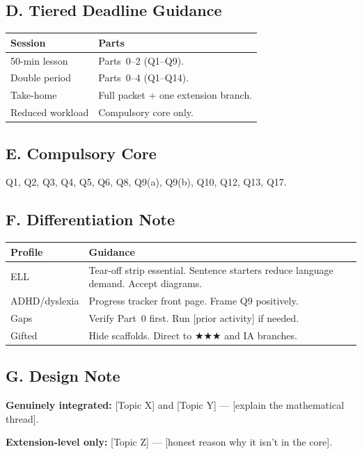 \documentclass[11pt,a4paper]{article}
\begin{document}
\subsection*{D. Tiered Deadline Guidance}
\begin{tabular}{@{}p{3.8cm}p{10.8cm}@{}}
\toprule
\textbf{Session} & \textbf{Parts}\\
\midrule
50-min lesson & Parts~0--2 (Q1--Q9).\\
Double period & Parts~0--4 (Q1--Q14).\\
Take-home & Full packet + one extension branch.\\
Reduced workload & Compulsory core only.\\
\bottomrule
\end{tabular}

\subsection*{E. Compulsory Core}
Q1, Q2, Q3, Q4, Q5, Q6, Q8, Q9(a), Q9(b), Q10, Q12, Q13, Q17.

\subsection*{F. Differentiation Note}
\begin{tabular}{@{}p{3.8cm}p{10.8cm}@{}}
\toprule
\textbf{Profile} & \textbf{Guidance}\\
\midrule
ELL & Tear-off strip essential. Sentence starters reduce language demand. Accept diagrams.\\[4pt]
ADHD/dyslexia & Progress tracker front page. Frame Q9 positively.\\[4pt]
Gaps & Verify Part~0 first. Run [prior activity] if needed.\\[4pt]
Gifted & Hide scaffolds. Direct to $\bigstar\bigstar\bigstar$ and IA branches.\\
\bottomrule
\end{tabular}

\subsection*{G. Design Note}
\textbf{Genuinely integrated:} [Topic X] and [Topic Y] --- [explain the mathematical thread].

\textbf{Extension-level only:} [Topic Z] --- [honest reason why it isn't in the core].
\end{document}

